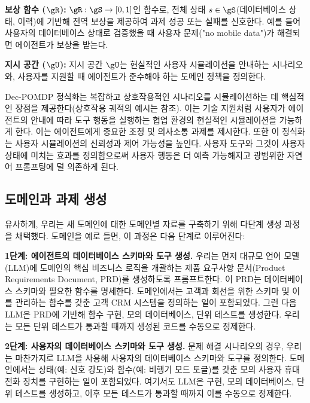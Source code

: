 \textbf{보상 함수 ($\gR$):} $\gR: \gS \to [0, 1]$인 함수로, 전체 상태 $s \in \gS$(데이터베이스 상태, 이력)에 기반해 전역 보상을 제공하여 과제 성공 또는 실패를 신호한다. 예를 들어  사용자의 데이터베이스 상태로 검증했을 때 사용자 문제("no mobile data")가 해결되면 에이전트가 보상을 받는다.

\textbf{지시 공간 ($\gU$):} 지시 공간 $\gU$는 현실적인 사용자 시뮬레이션을 안내하는 시나리오와, 사용자를 지원할 때 에이전트가 준수해야 하는 도메인 정책을 정의한다.

Dec-POMDP 정식화는 복잡하고 상호작용적인 시나리오를 시뮬레이션하는 데 핵심적인 장점을 제공한다(상호작용 궤적의 예시는  참조). 
이는 기술 지원처럼 사용자가 에이전트의 안내에 따라 도구 행동을 실행하는 협업 환경의 현실적인 시뮬레이션을 가능하게 한다. 이는 에이전트에게 중요한 조정 및 의사소통 과제를 제시한다. 
또한 이 정식화는 사용자 시뮬레이션의 신뢰성과 제어 가능성을 높인다. 사용자 도구와 그것이 사용자 상태에 미치는 효과를 정의함으로써 사용자 행동은 더 예측 가능해지고 광범위한 자연어 프롬프팅에 덜 의존하게 된다.



\subsection{도메인과 과제 생성}
\label{sec:curating_domains}



 유사하게, 우리는 새 도메인에 대한 도메인별 자료를 구축하기 위해 다단계 생성 과정을 채택했다. \telecom 도메인을 예로 들면, 이 과정은 다음 단계로 이루어진다:

\textbf{1단계: 에이전트의 데이터베이스 스키마와 도구 생성.}
우리는 먼저 대규모 언어 모델(LLM)에 도메인의 핵심 비즈니스 로직을 개괄하는 제품 요구사항 문서(Product Requirements Document, PRD)를 생성하도록 프롬프트한다. 이 PRD는 데이터베이스 스키마와 필요한 함수를 명세한다. \telecom 도메인에서는 고객과 회선을 위한 스키마 및 이를 관리하는 함수를 갖춘 고객 CRM 시스템을 정의하는 일이 포함되었다. 그런 다음 LLM은 PRD에 기반해 함수 구현, 모의 데이터베이스, 단위 테스트를 생성한다. 우리는 모든 단위 테스트가 통과할 때까지 생성된 코드를 수동으로 정제한다.

\textbf{2단계: 사용자의 데이터베이스 스키마와 도구 생성.}
문제 해결 시나리오의 경우, 우리는 마찬가지로 LLM을 사용해 사용자의 데이터베이스 스키마와 도구를 정의한다. \telecom 도메인에서는 상태(예: 신호 강도)와 함수(예: 비행기 모드 토글)를 갖춘 모의 사용자 휴대전화 장치를 구현하는 일이 포함되었다. 여기서도 LLM은 구현, 모의 데이터베이스, 단위 테스트를 생성하고, 이후 모든 테스트가 통과할 때까지 이를 수동으로 정제한다.

